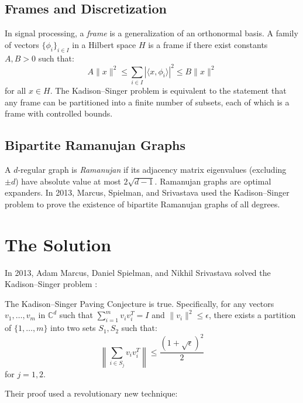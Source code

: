 \subsection{Frames and Discretization}
In signal processing, a \emph{frame} is a generalization of an orthonormal basis. A family of vectors $\{\phi_i\}_{i \in I}$ in a Hilbert space $H$ is a frame if there exist constants $A, B > 0$ such that:
\begin{equation}
A \|x\|^2 \leq \sum_{i \in I} |\langle x, \phi_i \rangle|^2 \leq B \|x\|^2
\end{equation}
for all $x \in H$. The Kadison--Singer problem is equivalent to the statement that any frame can be partitioned into a finite number of subsets, each of which is a frame with controlled bounds.

\subsection{Bipartite Ramanujan Graphs}
A $d$-regular graph is \emph{Ramanujan} if its adjacency matrix eigenvalues (excluding $\pm d$) have absolute value at most $2\sqrt{d-1}$. Ramanujan graphs are optimal expanders. In 2013, Marcus, Spielman, and Srivastava used the Kadison--Singer problem to prove the existence of bipartite Ramanujan graphs of all degrees.

\section{The Solution}

In 2013, Adam Marcus, Daniel Spielman, and Nikhil Srivastava solved the Kadison--Singer problem \cite{marcus2015a, marcus2015b}:

\begin{theorem}
The Kadison--Singer Paving Conjecture is true. Specifically, for any vectors $v_1, \ldots, v_m$ in $\mathbb{C}^d$ such that $\sum_{i=1}^m v_i v_i^T = I$ and $\|v_i\|^2 \leq \epsilon$, there exists a partition of $\{1, \ldots, m\}$ into two sets $S_1, S_2$ such that:
\begin{equation}
\left\|\sum_{i \in S_j} v_i v_i^T\right\| \leq \frac{(1 + \sqrt{\epsilon})^2}{2}
\end{equation}
for $j=1,2$.
\end{theorem}

Their proof used a revolutionary new technique:

